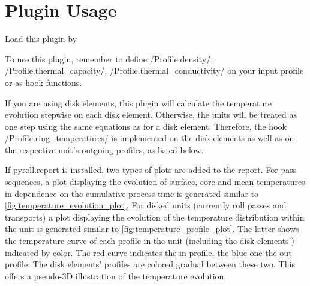 \documentclass{PyRollDocs}
\begin{document}
    \section{Plugin Usage}\label{sec:plugin-usage}

    Load this plugin by


    To use this plugin, remember to define \py/Profile.density/, \py/Profile.thermal_capacity/, \py/Profile.thermal_conductivity/ on your input profile or as hook functions.

    If you are using disk elements, this plugin will calculate the temperature evolution stepwise on each disk element.
    Otherwise, the units will be treated as one step using the same equations as for a disk element.
    Therefore, the hook \py/Profile.ring_temperatures/ is implemented on the disk elements as well as on the respective unit's outgoing profiles, as listed below.

    If {pyroll.report} is installed, two types of plots are added to the report.
    For pass sequences, a plot displaying the evolution of surface, core and mean temperatures in dependence on the cumulative process time is generated similar to \autoref{fig:temperature_evolution_plot}.
    For disked units (currently roll passes and transports) a plot displaying the evolution of the temperature distribution within the unit is generated similar to \autoref{fig:temperature_profile_plot}.
    The latter shows the temperature curve of each profile in the unit (including the disk elements') indicated by color.
    The red curve indicates the in profile, the blue one the out profile.
    The disk elements' profiles are colored gradual between these two.
    This offers a pseudo-3D illustration of the temperature evolution.
\end{document}
